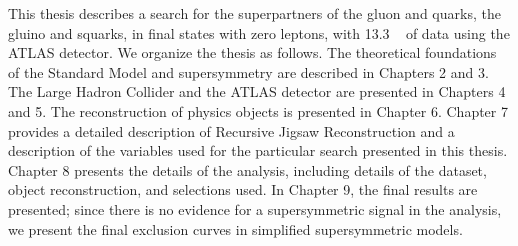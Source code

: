 This thesis describes a search for the superpartners of the gluon and quarks, the gluino and squarks, in final states with zero leptons, with 13.3 \ifb~ of data using the ATLAS detector.
We organize the thesis as follows.
The theoretical foundations of the Standard Model and supersymmetry are described in Chapters 2 and 3.
The Large Hadron Collider and the ATLAS detector are presented in Chapters 4 and 5.
The reconstruction of physics objects is presented in Chapter 6.
Chapter 7 provides a detailed description of Recursive Jigsaw Reconstruction and a description of the variables used for the particular search presented in this thesis.
Chapter 8 presents the details of the analysis, including details of the dataset, object reconstruction, and selections used.
In Chapter 9, the final results are presented; since there is no evidence for a supersymmetric signal in the analysis, we present the final exclusion curves in simplified supersymmetric models.
